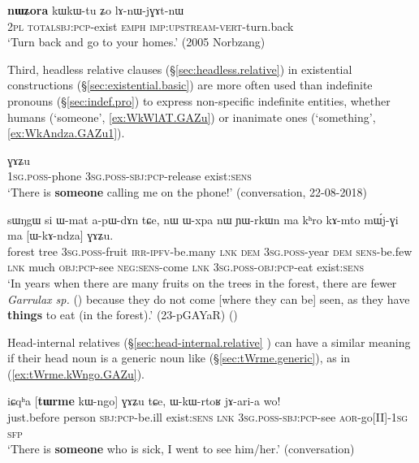\begin{exe}
\ex \label{ex:nWZora.kWkWtu}
\gll  \textbf{nɯʑora} kɯ\redp{}kɯ-tu ʑo lɤ-nɯ-jɣɤt-nɯ \\
\textsc{2pl} \textsc{total}\redp{}\textsc{sbj}:\textsc{pcp}-exist \textsc{emph} \textsc{imp}:\textsc{upstream}-\textsc{vert}-turn.back \\
\glt `Turn back and go to your homes.' (2005 Norbzang)
\end{exe}

Third, headless relative clauses (§\ref{sec:headless.relative}) in existential constructions (§\ref{sec:existential.basic}) are more often used than indefinite pronouns (§\ref{sec:indef.pro}) to express non-specific indefinite entities, whether humans (`someone', \ref{ex:WkWlAT.GAZu}) or inanimate ones  (`something', \ref{ex:WkAndza.GAZu1}).

\begin{exe}
\ex \label{ex:WkWlAT.GAZu}
 ɣɤʑu \\
 \textsc{1sg}.\textsc{poss}-phone \textsc{3sg}.\textsc{poss}-\textsc{sbj}:\textsc{pcp}-release exist:\textsc{sens} \\
\glt `There is \textbf{someone} calling me on the phone!' (conversation, 22-08-2018)
\end{exe}

\begin{exe}
\ex \label{ex:WkAndza.GAZu1}
\gll sɯŋgɯ si ɯ-mat a-pɯ-dɤn tɕe, nɯ ɯ-xpa nɯ ɲɯ-rkɯn ma kʰro kɤ-mto mɯ́j-ɣi ma [ɯ-kɤ-ndza] ɣɤʑu. \\
forest tree \textsc{3sg}.\textsc{poss}-fruit \textsc{irr}-\textsc{ipfv}-be.many \textsc{lnk} \textsc{dem} \textsc{3sg}.\textsc{poss}-year \textsc{dem} \textsc{sens}-be.few \textsc{lnk} much \textsc{obj}:\textsc{pcp}-see \textsc{neg}:\textsc{sens}-come \textsc{lnk} \textsc{3sg}.\textsc{poss}-\textsc{obj}:\textsc{pcp}-eat exist:\textsc{sens} \\
\glt `In years when there are many fruits on the trees in the forest, there are fewer \textit{Garrulax sp.} () because they do not come [where they can be] seen, as they have \textbf{things} to eat (in the forest).' (23-pGAYaR)
()
\end{exe}

Head-internal relatives (§\ref{sec:head-internal.relative} ) can have a similar meaning if their head noun is a generic noun like  (§\ref{sec:tWrme.generic}), as in (\ref{ex:tWrme.kWngo.GAZu}).

\begin{exe}
\ex \label{ex:tWrme.kWngo.GAZu}
\gll  iɕqʰa [\textbf{tɯrme} kɯ-ngo] ɣɤʑu tɕe, ɯ-kɯ-rtoʁ jɤ-ari-a wo! \\
just.before person \textsc{sbj}:\textsc{pcp}-be.ill exist:\textsc{sens} \textsc{lnk} \textsc{3sg}.\textsc{poss}-\textsc{sbj}:\textsc{pcp}-see \textsc{aor}-go[II]-\textsc{1sg} \textsc{sfp} \\
\glt `There is \textbf{someone} who is sick, I went to see him/her.' (conversation)
\end{exe}

